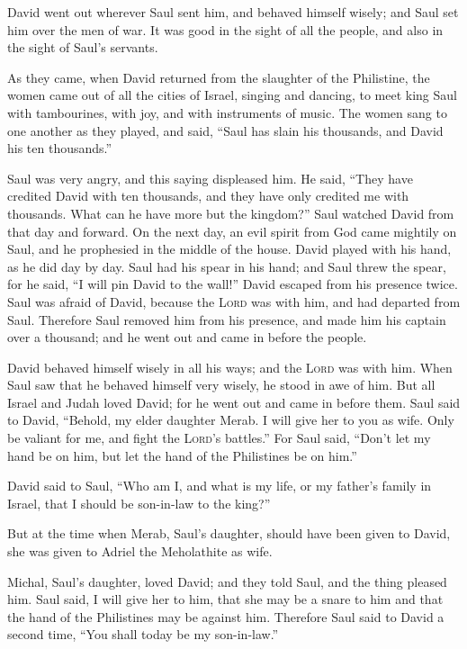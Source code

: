  David went out wherever Saul sent him, and behaved
himself wisely; and Saul set him over the men of war. It was good in the
sight of all the people, and also in the sight of Saul's servants.

 As they came, when David returned from the slaughter of
the Philistine, the women came out of all the cities of Israel, singing
and dancing, to meet king Saul with tambourines, with joy, and with
instruments of music.  The women sang to one another as
they played, and said, ``Saul has slain his thousands, and David his ten
thousands.''

 Saul was very angry, and this saying displeased him. He
said, ``They have credited David with ten thousands, and they have only
credited me with thousands. What can he have more but the kingdom?''
 Saul watched David from that day and forward.
 On the next day, an evil spirit from God came mightily
on Saul, and he prophesied in the middle of the house. David played with
his hand, as he did day by day. Saul had his spear in his hand;
 and Saul threw the spear, for he said, ``I will pin
David to the wall!'' David escaped from his presence twice.
 Saul was afraid of David, because the \textsc{Lord} was
with him, and had departed from Saul.  Therefore Saul
removed him from his presence, and made him his captain over a thousand;
and he went out and came in before the people.

 David behaved himself wisely in all his ways; and the
\textsc{Lord} was with him.  When Saul saw that he
behaved himself very wisely, he stood in awe of him.  But
all Israel and Judah loved David; for he went out and came in before
them.  Saul said to David, ``Behold, my elder daughter
Merab. I will give her to you as wife. Only be valiant for me, and fight
the \textsc{Lord}'s battles.'' For Saul said, ``Don't let my hand be on
him, but let the hand of the Philistines be on him.''

 David said to Saul, ``Who am I, and what is my life, or
my father's family in Israel, that I should be son-in-law to the king?''

 But at the time when Merab, Saul's daughter, should have
been given to David, she was given to Adriel the Meholathite as wife.

 Michal, Saul's daughter, loved David; and they told
Saul, and the thing pleased him.  Saul said, I will give
her to him, that she may be a snare to him and that the hand of the
Philistines may be against him. Therefore Saul said to David a second
time, ``You shall today be my son-in-law.''

